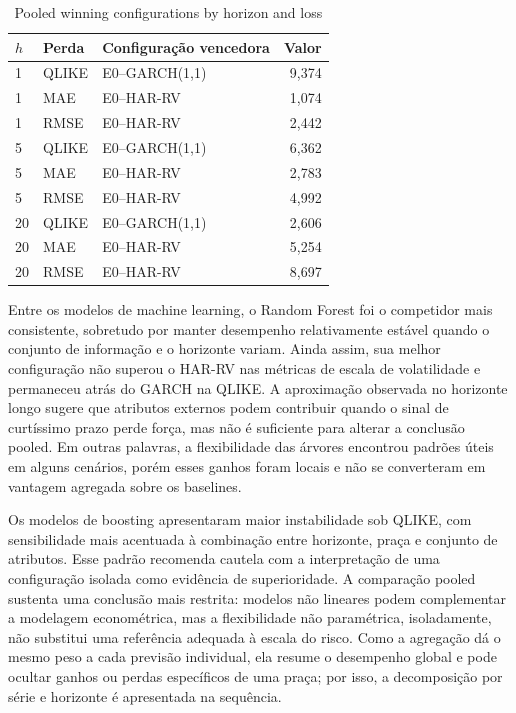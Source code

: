 \documentclass[a4paper,fleqn]{cas-sc}
\begin{document}
\begin{table}[t]
\centering
\caption{Pooled winning configurations by horizon and loss}
\label{tab:pooled_results}
\scriptsize
\setlength{\tabcolsep}{2pt}
\begin{tabular}{@{}p{0.65cm}p{1.05cm}p{2.55cm}r@{}}
\hline
\(h\) & Perda & Configuração vencedora & Valor \\
\hline
1 & QLIKE & E0--GARCH(1,1) & 9,374 \\
1 & MAE & E0--HAR-RV & 1,074 \\
1 & RMSE & E0--HAR-RV & 2,442 \\
5 & QLIKE & E0--GARCH(1,1) & 6,362 \\
5 & MAE & E0--HAR-RV & 2,783 \\
5 & RMSE & E0--HAR-RV & 4,992 \\
20 & QLIKE & E0--GARCH(1,1) & 2,606 \\
20 & MAE & E0--HAR-RV & 5,254 \\
20 & RMSE & E0--HAR-RV & 8,697 \\
\hline
\end{tabular}
\end{table}

Entre os modelos de machine learning, o Random Forest foi o competidor mais consistente, sobretudo por manter desempenho relativamente estável quando o conjunto de informação e o horizonte variam. Ainda assim, sua melhor configuração não superou o HAR-RV nas métricas de escala de volatilidade e permaneceu atrás do GARCH na QLIKE. A aproximação observada no horizonte longo sugere que atributos externos podem contribuir quando o sinal de curtíssimo prazo perde força, mas não é suficiente para alterar a conclusão pooled. Em outras palavras, a flexibilidade das árvores encontrou padrões úteis em alguns cenários, porém esses ganhos foram locais e não se converteram em vantagem agregada sobre os baselines.

Os modelos de boosting apresentaram maior instabilidade sob QLIKE, com sensibilidade mais acentuada à combinação entre horizonte, praça e conjunto de atributos. Esse padrão recomenda cautela com a interpretação de uma configuração isolada como evidência de superioridade. A comparação pooled sustenta uma conclusão mais restrita: modelos não lineares podem complementar a modelagem econométrica, mas a flexibilidade não paramétrica, isoladamente, não substitui uma referência adequada à escala do risco. Como a agregação dá o mesmo peso a cada previsão individual, ela resume o desempenho global e pode ocultar ganhos ou perdas específicos de uma praça; por isso, a decomposição por série e horizonte é apresentada na sequência.
\end{document}
